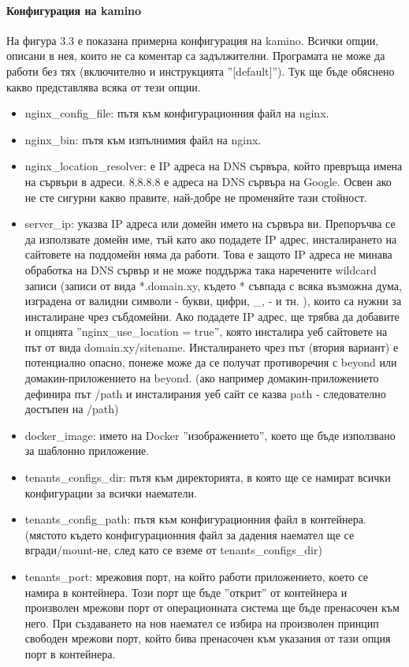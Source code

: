 \documentclass[pdftex,14pt,a4paper]{extreport}
\begin{document}
\paragraph {Конфигурация на kamino\\}
На фигура 3.3 е показана примерна конфигурация на kamino. Всички опции, описани в нея, които не са коментар са задължителни. Програмата не може да работи без тях (включително и инструкцията ''[default]''). Тук ще бъде обяснено какво представлява всяка от тези опции.
\begin{itemize}
  \item nginx\_config\_file: пътя към конфигурационния файл на nginx.
  \item nginx\_bin:  пътя към изпълнимия файл на nginx.
  \item nginx\_location\_resolver: е IP адреса на DNS сървъра, който превръща имена на сървъри в адреси. 8.8.8.8 е адреса на DNS сървъра на Google. Освен ако не сте сигурни какво правите, най-добре не променяйте тази стойност.
  \item server\_ip: указва IP адреса или домейн името на сървъра ви. Препоръчва се да използвате домейн име, тъй като ако подадете IP адрес, инсталирането на сайтовете на поддомейн няма да работи. Това е защото IP адреса не минава обработка на DNS сървър и не може поддържа така наречените wildcard записи (записи от вида *.domain.xy, където * съвпада с всяка възможна дума, изградена от валидни символи - букви, цифри, \_, - и тн. ), които са нужни за инсталиране чрез събдомейни.  Ако подадете IP адрес, ще трябва да добавите и опцията ''nginx\_use\_location = true'', която инсталира уеб сайтовете на път от вида domain.xy/sitename. Инсталирането чрез път (втория вариант) е потенциално опасно, понеже може да се получат противоречия с beyond или домакин-приложението на beyond. (ако например домакин-приложението дефинира път /path и инсталирания уеб сайт се казва path - следователно достъпен на /path)
  \item docker\_image: името на Docker ''изображението'', което ще бъде използвано за шаблонно приложение.
  \item tenants\_configs\_dir: пътя към директорията, в която ще се намират всички конфигурации за всички наематели.
  \item tenants\_config\_path: пътя към конфигурационния файл в контейнера. (мястото където конфигурационния файл за дадения наемател ще се вгради/mount-не, след като се вземе от tenants\_configs\_dir)
  \item tenants\_port: мрежовия порт, на който работи приложението, което се намира в контейнера. Този порт ще бъде ''открит'' от контейнера и произволен мрежови порт от операционната система ще бъде пренасочен към него. При създаването на нов наемател се избира на произволен принцип свободен мрежови порт, който бива пренасочен към указания от тази опция порт в контейнера.

\end{itemize}
\end{document}
